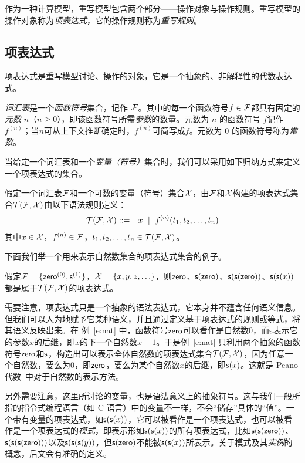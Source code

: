 作为一种计算模型，重写模型包含两个部分——操作对象与操作规则。重写模型的操作对象称为\emph{项表达式}，它的操作规则称为\emph{重写规则}。

\subsection{项表达式}

项表达式是重写模型讨论、操作的对象，它是一个抽象的、非解释性的代数表达式。

\emph{词汇表}是一个\emph{函数符号}集合，记作 $\cF$。其中的每一个函数符号$f\in\cF$都具有固定的\emph{元数} $n$（$n\ge 0$），即该函数符号所需\emph{参数}的数量。元数为 $n$ 的函数符号 $f$记作$f^{(n)}$；当$n$可从上下文推断确定时，$f^{(n)}$可简写成$f$。元数为 $0$ 的函数符号称为\emph{常数}。

当给定一个词汇表和一个\emph{变量（符号）}集合时，我们可以采用如下归纳方式来定义一个项表达式的集合。

\begin{definition}[项表达式]
\label{d:term}
假定一个词汇表$\cF$和一个可数的变量（符号）集合$\cX$，由$\cF$和$\cX$构建的项表达式集合$\TFX$由以下语法规则定义：
\begin{eqnarray}
    \TFX & ::= & x ~\mid~ f^{(n)}(t_1,t_2,\ldots,t_n) \nonumber 
\end{eqnarray}
其中$x\in\cX$，$f^{(n)}\in\cF$，$t_1,t_2,\ldots,t_n\in\TFX$。
\end{definition}

下面我们举一个用来表示自然数集合的项表达式集合的例子。

\begin{example}
\label{e:nat}
假定$\cF = \{\zero^{(0)}, \s^{(1)}\}$，$\cX=\{x,y,z,\ldots\}$，则$\zero$、$\s(\zero)$、$\s(\s(\zero))$、$\s(\s(x))$都是属于$\TFX$的项表达式。
\end{example}

需要注意，项表达式只是一个抽象的语法表达式，它本身并不蕴含任何语义信息。但我们可以人为地赋予它某种语义，并且通过定义基于项表达式的规则或等式，将其语义反映出来。在
例~\ref{e:nat} 中，函数符号$\zero$可以看作是自然数$0$，而$\s$表示它的参数$x$的后继，即$x$的下一个自然数$x+1$。于是例~\ref{e:nat} 只利用两个抽象的函数符号$\zero$和$\s$，构造出可以表示全体自然数的项表达式集合$\TFX$，因为任意一个自然数，要么为$0$，即$\zero$，要么为某个自然数$x$的后继，即$\s(x)$。这就是 Peano 代数~\cite{Kaye1991-KAYMOP}中对于自然数的表示方法。

另外需要注意，这里所讨论的变量，也是语法意义上的抽象符号。这与我们一般所指的指令式编程语言（如 C 语言）中的变量不一样，不会“储存”具体的“值”。一个带有变量的项表达式，如$\s(\s(x))$，它可以被看作是一个项表达式，也可以被看作是一个项表达式的\emph{模式}，即表示形如$\s(\s(x))$的所有项表达式，比如$\s(\s(\zero))$、$\s(\s(\s(\zero)))$以及$\s(\s(\s(y))$，但$\s(\zero)$不能被$\s(\s(x))$所表示。关于模式及其\emph{实例}的概念，后文会有准确的定义。

